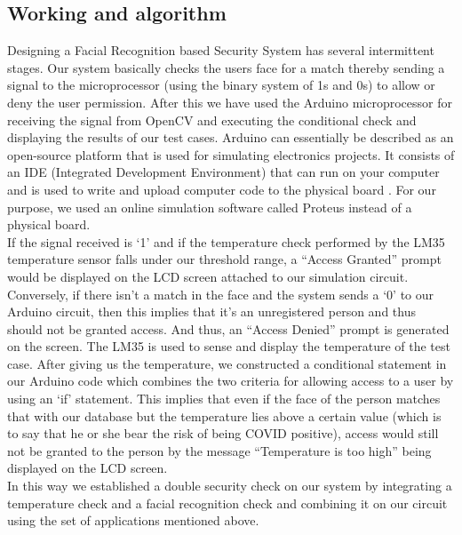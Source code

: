 \documentclass[conference]{IEEEtran}
\begin{document}
	\subsection{Working and algorithm}
	Designing a Facial Recognition based Security System has
	several intermittent stages. Our system basically checks the users face for a match thereby sending a signal to the microprocessor (using the binary system of 1s and 0s) to allow or deny the user permission.
	After this we have used the Arduino microprocessor for
	receiving the signal from OpenCV \cite{e} and executing the
	conditional check and displaying the results of our test cases. Arduino can essentially be described as an open-source platform that is used for simulating electronics projects. It consists of an IDE (Integrated Development Environment) that can run on your computer and is used to write and upload computer code to the physical board \cite{h}. For our purpose, we used an online simulation software called Proteus instead of
	a physical board.
	\\If the signal received is ‘1’ and if the temperature check performed by the LM35 temperature sensor falls under our threshold range, a “Access Granted” prompt would be displayed on the LCD screen attached to our simulation circuit.
	\\Conversely, if there isn't a match in the face and the system sends a ‘0’ to our Arduino circuit, then this implies that it's an unregistered person and thus should not be granted access. And thus, an “Access Denied” prompt is generated on the screen. The LM35 is used to sense and display the temperature \cite{c} of the test case. After giving us the temperature, we constructed a conditional statement in our Arduino code which combines the two criteria for allowing access to a user by using an ‘if’ statement. This implies that even if the face of the person matches that with our database but the temperature lies above a certain value (which is to say that he or she bear the risk of being COVID positive), access would still not be granted to the person by the message “Temperature is too high” being
	displayed on the LCD screen.
	\\In this way we established a double security check on our system by integrating a temperature check and a facial recognition check and combining it on our circuit using the set of applications mentioned above.
\end{document}
